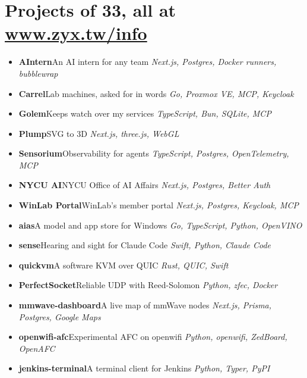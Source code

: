 \documentclass[10pt,a4paper]{article}
\begin{document}
\section{Projects\hfill{\small{} of 33, all at \href{https://www.zyx.tw/info\#projects}{www.zyx.tw/info}}}
\begin{itemize}[itemsep=0pt]
\item \textbf{AIntern}\quad An AI intern for any team \hfill {\small\itshape Next.js, Postgres, Docker runners, bubblewrap}
\item \textbf{Carrel}\quad Lab machines, asked for in words \hfill {\small\itshape Go, Proxmox VE, MCP, Keycloak}
\item \textbf{Golem}\quad Keeps watch over my services \hfill {\small\itshape TypeScript, Bun, SQLite, MCP}
\item \textbf{Plump}\quad SVG to 3D \hfill {\small\itshape Next.js, three.js, WebGL}
\item \textbf{Sensorium}\quad Observability for agents \hfill {\small\itshape TypeScript, Postgres, OpenTelemetry, MCP}
\item \textbf{NYCU AI}\quad NYCU Office of AI Affairs \hfill {\small\itshape Next.js, Postgres, Better Auth}
\item \textbf{WinLab Portal}\quad WinLab's member portal \hfill {\small\itshape Next.js, Postgres, Keycloak, MCP}
\item \textbf{aias}\quad A model and app store for Windows \hfill {\small\itshape Go, TypeScript, Python, OpenVINO}
\item \textbf{sense}\quad Hearing and sight for Claude Code \hfill {\small\itshape Swift, Python, Claude Code}
\item \textbf{quickvm}\quad A software KVM over QUIC \hfill {\small\itshape Rust, QUIC, Swift}
\item \textbf{PerfectSocket}\quad Reliable UDP with Reed-Solomon \hfill {\small\itshape Python, zfec, Docker}
\item \textbf{mmwave-dashboard}\quad A live map of mmWave nodes \hfill {\small\itshape Next.js, Prisma, Postgres, Google Maps}
\item \textbf{openwifi-afc}\quad Experimental AFC on openwifi \hfill {\small\itshape Python, openwifi, ZedBoard, OpenAFC}
\item \textbf{jenkins-terminal}\quad A terminal client for Jenkins \hfill {\small\itshape Python, Typer, PyPI}
\end{itemize}
\end{document}

